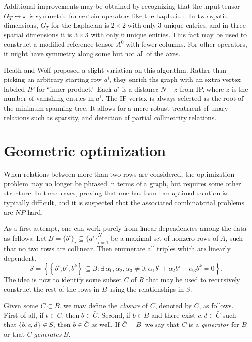 Additional improvements may be obtained by recognizing that the input
tensor $ G_T \leftrightarrow x $ is symmetric for certain operators
like the Laplacian. In two spatial dimensions, $ G_T $ for the Laplacian
is $ 2 \times 2 $ with only 3 unique entries, and in three spatial
dimensions it is $ 3 \times 3 $ with only 6 unique entries. This fact
may be used to construct a modified reference tensor $ A^0 $ with
fewer columns. For other operators, it might have symmetry along some
but not all of the axes.

Heath and Wolf proposed a slight variation on this algorithm. Rather
than picking an arbitrary starting row $ a^i $, they enrich the graph
with an extra vertex labeled \textit{IP} for ``inner product.''  Each
$ a^i $ is a distance $ N - z $ from IP, where $ z $ is the number of
vanishing entries in $ a^i $. The IP vertex is always selected as the
root of the minimum spanning tree. It allows for a more robust
treatment of unary relations such as sparsity, and detection of
partial collinearity relations.

\section{Geometric optimization}
\label{sec:kirby-4:geom}

When relations between more than two rows are considered, the
optimization problem may no longer be phrased in terms of a graph, but
requires some other structure. In these cases, proving that one has
found an optimal solution is typically difficult, and it is suspected
that the associated combinatorial problems are $ NP $-hard.

As a first attempt, one can work purely from linear dependencies among
the data as follows. Let $ B=\{ b^i \}_i \subseteq \{ a^i \}_{i=1}^N
$ be a maximal set of nonzero rows of $ A $, such that no two rows are
collinear. Then enumerate all triples which are linearly dependent,
\begin{equation}
  S= \left\{ \left\{ b^i , b^j , b^k \right\} \subseteq B:
  \exists \, \alpha_1, \alpha_2, \alpha_3 \neq 0:
  \alpha_1 b^i + \alpha_2 b^j + \alpha_3 b^k = 0 \right\}.
\end{equation}
The idea is now to identify some subset $C$ of $ B $ that may be used
to recursively construct the rest of the rows in $ B $ using the
relationships in $ S $.

Given some $ C \subset B $, we may define the \emph{closure} of $
C $, denoted by $ \bar{C} $, as follows. First of all, if $ b
\in C $, then $ b \in \bar{C} $. Second, if $ b \in B $ and
there exist $ c,d \in \bar{C} $ such that $ \{b,c,d\} \in S $, then $
b \in \bar{C} $ as well. If $ \bar{C} = B$, we say that $ C $ is
a \emph{generator} for $ B $ or that $ C $
\emph{generates} $ B $.

